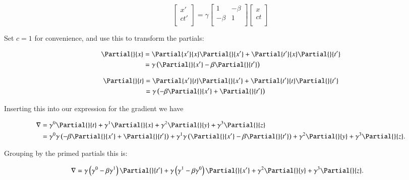 \begin{equation*}
\begin{bmatrix}
x' \\
ct' \\
\end{bmatrix}
=
\gamma
\begin{bmatrix}
1 & -\beta \\
-\beta & 1 \\
\end{bmatrix}
\begin{bmatrix}
x \\
ct \\
\end{bmatrix}
\end{equation*}

Set $c=1$ for convenience, and use this to transform the partials:

\begin{align*}
\Partial{}{x} 
&= \Partial{x'}{x} \Partial{}{x'} + \Partial{t'}{x} \Partial{}{t'} \\
&= \gamma \left( \Partial{}{x'} -\beta \Partial{}{t'} \right) \\
\end{align*}

\begin{align*}
\Partial{}{t} 
&= \Partial{x'}{t} \Partial{}{x'} + \Partial{t'}{t} \Partial{}{t'} \\
&= \gamma \left( -\beta \Partial{}{x'} + \Partial{}{t'} \right) \\
\end{align*}

Inserting this into our expression for the gradient we have

\begin{align*}
\grad 
&= \gamma^0 \Partial{}{t}
 + \gamma^1 \Partial{}{x} 
 + \gamma^2 \Partial{}{y}
 + \gamma^3 \Partial{}{z} \\
&= \gamma^0 \gamma \left( -\beta \Partial{}{x'} + \Partial{}{t'} \right) 
 + \gamma^1 \gamma \left( \Partial{}{x'} -\beta \Partial{}{t'} \right)
 + \gamma^2 \Partial{}{y}
 + \gamma^3 \Partial{}{z}.
\end{align*}

Grouping by the primed partials this is:

\begin{align*}
\grad 
&= \gamma \left(\gamma^0 - \beta\gamma^1\right) \Partial{}{t'}
 + \gamma \left(\gamma^1 - \beta\gamma^0\right) \Partial{}{x'}
 + \gamma^2 \Partial{}{y}
 + \gamma^3 \Partial{}{z}.
\end{align*}


